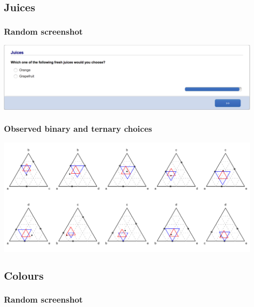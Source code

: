 \documentclass[11pt,letter]{article}
\begin{document}
\pagebreak

\subsection*{Juices}



\subsubsection*{Random screenshot}

\includegraphics[width=15cm]{Population_study_design/screenshot_juices.png}

\subsubsection*{Observed binary and ternary choices}

\includegraphics[width=15cm]{./Population_study_data/Simplexes/juices.pdf}

\pagebreak

\subsection*{Colours}



\subsubsection*{Random screenshot}
\end{document}
